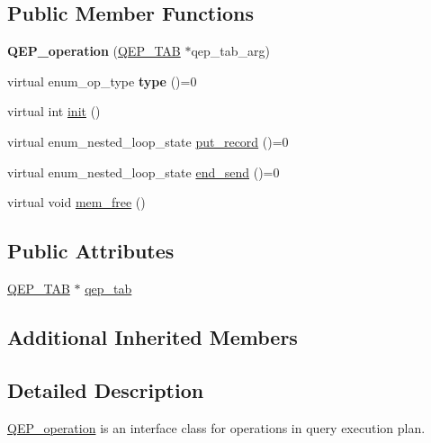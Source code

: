 \subsection*{Public Member Functions}
\begin{DoxyCompactItemize}
\item 
\mbox{\label{classQEP__operation_ab5ad1582685b000231aa888d4fe9ab2b}} 
{\bfseries Q\+E\+P\+\_\+operation} (\mbox{\hyperlink{classQEP__TAB}{Q\+E\+P\+\_\+\+T\+AB}} $\ast$qep\+\_\+tab\+\_\+arg)
\item 
\mbox{\label{classQEP__operation_a855dbd15985c3c4c71fa5cddb71474df}} 
virtual enum\+\_\+op\+\_\+type {\bfseries type} ()=0
\item 
virtual int \mbox{\hyperlink{classQEP__operation_a27930ae9c3ab63a046135704707190fa}{init}} ()
\item 
virtual enum\+\_\+nested\+\_\+loop\+\_\+state \mbox{\hyperlink{classQEP__operation_af7cac289b2b1a38349cc27e8a4ff7597}{put\+\_\+record}} ()=0
\item 
virtual enum\+\_\+nested\+\_\+loop\+\_\+state \mbox{\hyperlink{classQEP__operation_a4faf706cddaf3ae613fe92434776df5e}{end\+\_\+send}} ()=0
\item 
virtual void \mbox{\hyperlink{classQEP__operation_a5a3acf4022e1369ca5eadef33f61ac80}{mem\+\_\+free}} ()
\end{DoxyCompactItemize}
\subsection*{Public Attributes}
\begin{DoxyCompactItemize}
\item 
\mbox{\hyperlink{classQEP__TAB}{Q\+E\+P\+\_\+\+T\+AB}} $\ast$ \mbox{\hyperlink{classQEP__operation_aed9c7ecad9e27f9d3d73062a4890534a}{qep\+\_\+tab}}
\end{DoxyCompactItemize}
\subsection*{Additional Inherited Members}


\subsection{Detailed Description}
\mbox{\hyperlink{classQEP__operation}{Q\+E\+P\+\_\+operation}} is an interface class for operations in query execution plan.

